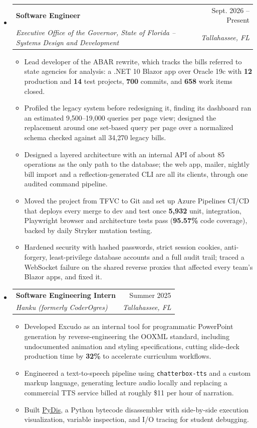 \documentclass[letterpaper,11pt]{article}
\makeatletter
\newcommand{\resumeItem}[1]{\item{\small\linespread{0.90}\selectfont #1\par}}
\newcommand{\resumeSubheading}[4]{
    \item
    \begin{tabular*}{\textwidth}[t]{l@{\extracolsep{\fill}}r@{}}
        \textbf{#1} & #2 \\
        \textit{#3} & \textit{#4} \\
    \end{tabular*}\vspace{-4pt}
}
\newcommand{\resumeSubHeadingListStart}{\begin{itemize}[leftmargin=0pt, label={}]}
\newcommand{\resumeSubHeadingListEnd}{\end{itemize}}
\newcommand{\resumeItemListStart}{\begin{itemize}[leftmargin=12pt, topsep=0pt, itemsep=0pt, label=$\bullet$]}
\newcommand{\resumeItemListEnd}{\end{itemize}\vspace{-6pt}}
\makeatother
\begin{document}
\resumeSubHeadingListStart
    \resumeSubheading
        {Software Engineer}{Sept. 2026 -- Present}
        {Executive Office of the Governor, State of Florida -- Systems Design and Development}{Tallahassee, FL}
    \resumeItemListStart
        \resumeItem{Lead developer of the ABAR rewrite, which tracks the bills referred to state agencies for analysis: a .NET 10 Blazor app over Oracle 19c with \textbf{12} production and \textbf{14} test projects, \textbf{700} commits, and \textbf{658} work items closed.}
        \resumeItem{Profiled the legacy system before redesigning it, finding its dashboard ran an estimated 9,500--19,000 queries per page view; designed the replacement around one set-based query per page over a normalized schema checked against all 34,270 legacy bills.}
        \resumeItem{Designed a layered architecture with an internal API of about 85 operations as the only path to the database; the web app, mailer, nightly bill import and a reflection-generated CLI are all its clients, through one audited command pipeline.}
        \resumeItem{Moved the project from TFVC to Git and set up Azure Pipelines CI/CD that deploys every merge to dev and test once \textbf{5,932} unit, integration, Playwright browser and architecture tests pass (\textbf{95.57\%} code coverage), backed by daily Stryker mutation testing.}
        \resumeItem{Hardened security with hashed passwords, strict session cookies, anti-forgery, least-privilege database accounts and a full audit trail; traced a WebSocket failure on the shared reverse proxies that affected every team's Blazor apps, and fixed it.}
    \resumeItemListEnd

    \resumeSubheading
        {Software Engineering Intern}{Summer 2025}
        {Hanku (formerly CoderOgres)}{Tallahassee, FL}
    \resumeItemListStart
        \resumeItem{Developed Excudo as an internal tool for programmatic PowerPoint generation by reverse-engineering the OOXML standard, including undocumented animation and styling specifications, cutting slide-deck production time by \textbf{32\%} to accelerate curriculum workflows.}
        \resumeItem{Engineered a text-to-speech pipeline using \texttt{chatterbox-tts} and a custom markup language, generating lecture audio locally and replacing a commercial TTS service billed at roughly \$11 per hour of narration.}
        \resumeItem{Built \href{https://github.com/dylantcon/pydis}{PyDis}, a Python bytecode disassembler with side-by-side execution visualization, variable inspection, and I/O tracing for student debugging.}
    \resumeItemListEnd
\resumeSubHeadingListEnd
\end{document}
